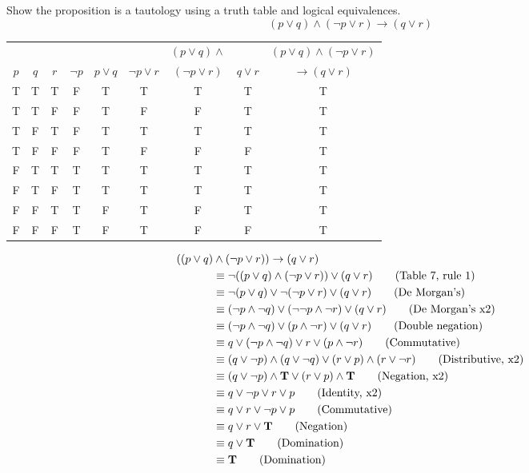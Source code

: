\documentclass[12pt]{exam}
\begin{document}
\begin{questions}
\question[10] Show the proposition is a tautology using a truth
table and logical equivalences.
 $$ (p \vee q) \wedge (\neg p \vee r) \rightarrow (q \vee r) $$
 \begin{solution}
   \begin{tabular}{ccc|cccccc}
         &     &     &          &            &                 & $(p
         \vee q) \wedge$ & & $(p \vee q) \wedge (\neg p \vee r)$ \\
     $p$ & $q$ & $r$ & $\neg p$ & $p \vee q$ & $\neg p \vee r$ &
     $(\neg p \vee r)$ & $q \vee r$ & $\rightarrow (q \vee r)$ \\
     \hline
     T & T & T & F & T & T & T & T & T\\
     T & T & F & F & T & F & F & T & T\\
     T & F & T & F & T & T & T & T & T\\
     T & F & F & F & T & F & F & F & T\\
     F & T & T & T & T & T & T & T & T\\
     F & T & F & T & T & T & T & T & T\\
     F & F & T & T & F & T & F & T & T\\
     F & F & F & T & F & T & F & F & T\\
   \end{tabular}

   \begin{align*}
        ((p \vee q) & \wedge (\neg p \vee r)) \rightarrow (q \vee r)
        \notag \\
         & \equiv \neg ((p \vee q) \wedge (\neg p \vee r)) \vee (q
         \vee r) \tag{Table 7, rule 1} \\
         & \equiv \neg (p \vee q) \vee \neg (\neg p \vee r) \vee (q
         \vee r) \tag{De Morgan's} \\
         & \equiv (\neg p \wedge \neg q) \vee (\neg \neg p \wedge
         \neg r) \vee (q \vee r) \tag{De Morgan's x2} \\
         & \equiv (\neg p \wedge \neg q) \vee (p \wedge
         \neg r) \vee (q \vee r) \tag{Double negation} \\
         & \equiv q \vee (\neg p \wedge \neg q) \vee r \vee (p \wedge
         \neg r) \tag{Commutative} \\
         & \equiv (q \vee \neg p) \wedge (q \vee \neg q) \vee (r
         \vee p) \wedge (r \vee \neg r) \tag{Distributive, x2}\\
         & \equiv (q \vee \neg p) \wedge {\bf T} \vee (r \vee p)
         \wedge {\bf T} \tag{Negation, x2} \\
         & \equiv q \vee \neg p \vee r \vee p \tag{Identity, x2} \\
         & \equiv q \vee r \vee \neg p \vee p \tag{Commutative} \\
         & \equiv q \vee r \vee {\bf T} \tag{Negation} \\
         & \equiv q \vee {\bf T} \tag{Domination} \\
         & \equiv {\bf T} \tag{Domination}
   \end{align*}



\end{solution}
\end{questions}
\end{document}
